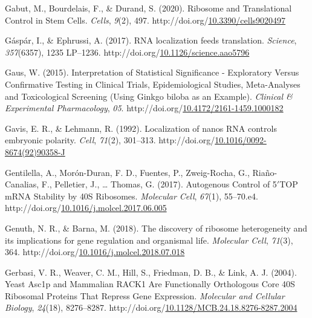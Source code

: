 \documentclass[12pt,oneside]{reedthesis}
\newlength{\cslhangindent}
\newenvironment{CSLReferences}[2] %
 {%
  \setlength{\parindent}{0pt}
  \ifodd #1 \everypar{\setlength{\hangindent}{\cslhangindent}}\ignorespaces\fi
  \ifnum #2 > 0
  \setlength{\parskip}{#2\baselineskip}
  \fi
 }%
 {}
\begin{document}
\begin{CSLReferences}{1}{0}
\leavevmode{}%
Gabut, M., Bourdelais, F., \& Durand, S. (2020). Ribosome and {Translational Control} in {Stem Cells}. \emph{Cells}, \emph{9}(2), 497. http://doi.org/\href{https://doi.org/10.3390/cells9020497}{10.3390/cells9020497}

\leavevmode{}%
Gáspár, I., \& Ephrussi, A. (2017). {RNA} localization feeds translation. \emph{Science}, \emph{357}(6357), 1235 LP--1236. http://doi.org/\href{https://doi.org/10.1126/science.aao5796}{10.1126/science.aao5796}

\leavevmode{}%
Gaus, W. (2015). Interpretation of {Statistical Significance} - {Exploratory Versus Confirmative Testing} in {Clinical Trials}, {Epidemiological Studies}, {Meta-Analyses} and {Toxicological Screening} ({Using Ginkgo} biloba as an {Example}). \emph{Clinical \& Experimental Pharmacology}, \emph{05}. http://doi.org/\href{https://doi.org/10.4172/2161-1459.1000182}{10.4172/2161-1459.1000182}

\leavevmode{}%
Gavis, E. R., \& Lehmann, R. (1992). Localization of nanos {RNA} controls embryonic polarity. \emph{Cell}, \emph{71}(2), 301--313. http://doi.org/\href{https://doi.org/10.1016/0092-8674(92)90358-J}{10.1016/0092-8674(92)90358-J}

\leavevmode{}%
Gentilella, A., Morón-Duran, F. D., Fuentes, P., Zweig-Rocha, G., Riaño-Canalias, F., Pelletier, J., \ldots{} Thomas, G. (2017). Autogenous {Control} of 5{\({'}\)}{TOP mRNA Stability} by {40S Ribosomes}. \emph{Molecular Cell}, \emph{67}(1), 55--70.e4. http://doi.org/\href{https://doi.org/10.1016/j.molcel.2017.06.005}{10.1016/j.molcel.2017.06.005}

\leavevmode{}%
Genuth, N. R., \& Barna, M. (2018). The discovery of ribosome heterogeneity and its implications for gene regulation and organismal life. \emph{Molecular Cell}, \emph{71}(3), 364. http://doi.org/\href{https://doi.org/10.1016/j.molcel.2018.07.018}{10.1016/j.molcel.2018.07.018}

\leavevmode{}%
Gerbasi, V. R., Weaver, C. M., Hill, S., Friedman, D. B., \& Link, A. J. (2004). Yeast {Asc1p} and {Mammalian RACK1 Are Functionally Orthologous Core 40S Ribosomal Proteins That Repress Gene Expression}. \emph{Molecular and Cellular Biology}, \emph{24}(18), 8276--8287. http://doi.org/\href{https://doi.org/10.1128/MCB.24.18.8276-8287.2004}{10.1128/MCB.24.18.8276-8287.2004}


\end{CSLReferences}
\end{document}
